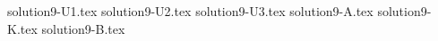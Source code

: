 \documentclass{article}
\begin{document}
{solution9-U1.tex}
{solution9-U2.tex}
{solution9-U3.tex}
{solution9-A.tex}
{solution9-K.tex}
{solution9-B.tex}
\end{document}
